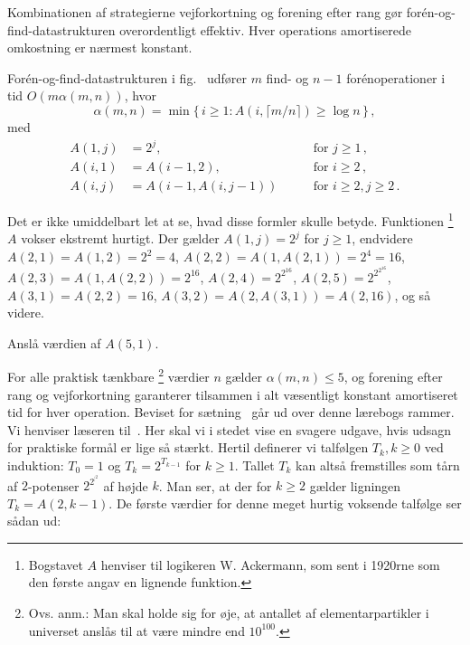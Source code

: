 Kombinationen af strategierne vejforkortning og forening efter rang gør forén-og-find-datastrukturen overordentligt effektiv.
Hver operations amortiserede omkostning er nærmest konstant.

\begin{thm}
  Forén-og-find-datastrukturen i fig.~ udfører $m$ find- og $n-1$ forén\-operationer i tid $O(m\alpha(m,n))$, hvor
\[ 
  \alpha(m,n) = \min\{\,i\geq 1\colon A(i,\lceil m/n\rceil)\geq \log n\,\}\,,
\]
  med
  \begin{align*}
    A(1,j)&= 2^j,&\text{for } j\geq 1\,,\\
    A(i,1)&= A(i-1,2),&\text{for } i\geq 2\,,\\
    A(i,j)&=A(i-1,A(i,j-1)) \qquad &\text{for } i\geq 2,j\geq 2\,.
  \end{align*}
\end{thm}

Det er ikke umiddelbart let at se, hvad disse formler skulle betyde.
Funktionen%
\footnote{Bogstavet $A$ henviser til logikeren W. Ackermann, som sent i 1920rne som den første angav en lignende funktion.}
$A$ vokser ekstremt hurtigt.
Der gælder $A(1,j)=2^j$ for $j\geq 1$, endvidere $A(2,1)=A(1,2)=2^2=4$, $A(2,2)=A(1,A(2,1))=2^4= 16$, $A(2,3)=A(1,A(2,2)) = 2^{16}$,
$A(2,4)=2^{2^{16}}$, 
$A(2,5)=2^{2^{2^{16}}}$, 
$A(3,1)=A(2,2)=16$,
$A(3,2)=A(2,A(3,1))=A(2,16)$, og så videre.

\begin{exerc}
 Anslå værdien af $A(5,1)$.
\end{exerc}

For alle praktisk tænkbare
\footnote{Ovs. anm.: Man skal holde sig for øje, at antallet af elementarpartikler i universet anslås til at være mindre end $10^{100}$.}
værdier $n$ gælder $\alpha(m,n)\leq 5$, og forening efter rang og vejforkortning garanterer tilsammen i alt væsentligt konstant amortiseret tid for hver operation.
Beviset for sætning~ går ud over denne lærebogs rammer.
Vi henviser læseren til~\cite{Tarjan:union-find,Seidel:union-find}.
Her skal vi i stedet vise en svagere udgave, hvis udsagn for praktiske formål er lige så stærkt.
Hertil definerer vi talfølgen $T_k, k\geq 0$ ved induktion: 
$T_0=1$ og $T_k= 2^{T_{k-1}}$ for $k\geq 1$.
Tallet $T_k$ kan altså fremstilles som tårn af $2$-potenser $2^{2^{\vdots^2}}$ af højde $k$.
Man ser, at der for $k\geq 2$ gælder ligningen $T_k = A(2,k-1)$.
De første værdier for denne meget hurtig voksende talfølge ser sådan ud:

